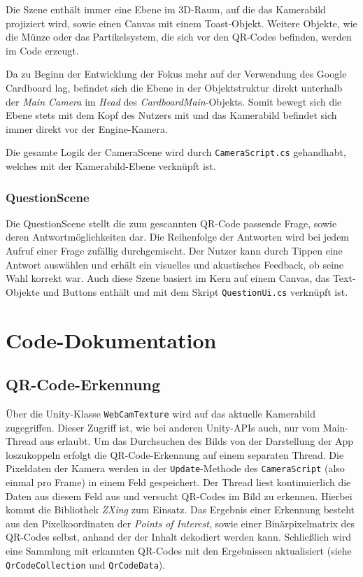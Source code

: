 Die Szene enthält immer eine Ebene im 3D-Raum, auf die das Kamerabild projiziert wird, sowie einen Canvas mit einem Toast-Objekt. Weitere Objekte, wie die Münze oder das Partikelsystem, die sich vor den QR-Codes befinden, werden im Code erzeugt.

Da zu Beginn der Entwicklung der Fokus mehr auf der Verwendung des Google Cardboard lag, befindet sich die Ebene in der Objektstruktur direkt unterhalb der \emph{Main Camera} im \emph{Head} des \emph{CardboardMain}-Objekts. Somit bewegt sich die Ebene stets mit dem Kopf des Nutzers mit und das Kamerabild befindet sich immer direkt vor der Engine-Kamera.

Die gesamte Logik der CameraScene wird durch \texttt{CameraScript.cs} gehandhabt, welches mit der Kamerabild-Ebene verknüpft ist.

\subsubsection{QuestionScene}
\label{subs:QuestionScene}
Die QuestionScene stellt die zum gescannten QR-Code passende Frage, sowie deren Antwortmöglichkeiten dar. Die Reihenfolge der Antworten wird bei jedem Aufruf einer Frage zufällig durchgemischt. Der Nutzer kann durch Tippen eine Antwort auswählen und erhält ein visuelles und akustisches Feedback, ob seine Wahl korrekt war. Auch diese Szene basiert im Kern auf einem Canvas, das Text-Objekte und Buttons enthält und mit dem Skript \texttt{QuestionUi.cs} verknüpft ist.

\section{Code-Dokumentation}
\subsection{QR-Code-Erkennung}
Über die Unity-Klasse \texttt{WebCamTexture} wird auf das aktuelle Kamerabild zugegriffen. Dieser Zugriff ist, wie bei anderen Unity-APIs auch, nur vom Main-Thread aus erlaubt. Um das Durchsuchen des Bilds von der Darstellung der App loszukoppeln erfolgt die QR-Code-Erkennung auf einem separaten Thread. Die Pixeldaten der Kamera werden in der \texttt{Update}-Methode des \texttt{CameraScript} (also einmal pro Frame) in einem Feld gespeichert. Der Thread liest kontinuierlich die Daten aus diesem Feld aus und versucht QR-Codes im Bild zu erkennen. Hierbei kommt die Bibliothek \emph{ZXing} zum Einsatz. Das Ergebnis einer Erkennung besteht aus den Pixelkoordinaten der \emph{Points of Interest}, sowie einer Binärpixelmatrix des QR-Codes selbst, anhand der der Inhalt dekodiert werden kann. Schließlich wird eine Sammlung mit erkannten QR-Codes mit den Ergebnissen aktualisiert (siehe \texttt{QrCodeCollection} und \texttt{QrCodeData}).

